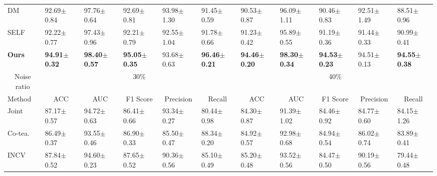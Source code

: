 \begin{table*}[]
\begin{tabular}{@{}lllllllllll@{}}
DM                       & 92.69$\pm$0.84          & 97.76$\pm$0.64          & 92.69$\pm$0.81               & 93.98$\pm$1.30          & 91.45$\pm$0.59             & 90.53$\pm$0.87          & 96.09$\pm$1.11          & 90.46$\pm$0.83               & 92.51$\pm$1.49          & 88.51$\pm$0.96             \\
SELF                            & 92.22$\pm$0.77          & 97.43$\pm$0.96          & 92.21$\pm$0.79               & 92.55$\pm$1.04          & 91.78$\pm$0.66             & 91.23$\pm$0.42          & 95.89$\pm$0.55          & 91.19$\pm$0.36               & 91.44$\pm$0.33          & 90.99$\pm$0.41             \\
\textbf{Ours}                   & \textbf{94.91$\pm$0.32} & \textbf{98.40$\pm$0.57} & \textbf{95.05$\pm$0.35}      & 93.68$\pm$0.63          & \textbf{96.46$\pm$0.21}    & \textbf{94.46$\pm$0.20} & \textbf{98.30$\pm$0.34} & \textbf{94.53$\pm$0.23}      & 94.51$\pm$0.13          & \textbf{94.55$\pm$0.38}    \\ \midrule
\multicolumn{1}{c}{Noise ratio} & \multicolumn{5}{c}{30\%}                                                                                                                & \multicolumn{5}{c}{40\%}                                                                                                                \\ \midrule
Method                & \multicolumn{1}{c}{ACC} & \multicolumn{1}{c}{AUC} & \multicolumn{1}{c}{F1 Score} & \multicolumn{1}{c}{{Precision}} & \multicolumn{1}{c}{Recall} & \multicolumn{1}{c}{ACC} & \multicolumn{1}{c}{AUC} & \multicolumn{1}{c}{F1 Score} & \multicolumn{1}{c}{{Precision}} & \multicolumn{1}{c}{Recall} \\ \midrule
Joint                     & 87.17$\pm$0.57          & 94.72$\pm$0.63          & 86.41$\pm$0.66               & 93.34$\pm$0.27          & 80.44$\pm$0.98             & 84.30$\pm$0.87          & 91.39$\pm$1.02          & 84.46$\pm$0.92               & 84.77$\pm$0.60          & 84.15$\pm$1.26             \\
Co-tea.                     & 86.49$\pm$0.37          & 93.55$\pm$0.46          & 86.90$\pm$0.33               & 85.50$\pm$0.47          & 88.34$\pm$0.20    & 84.92$\pm$0.57          & 92.98$\pm$0.68          & 84.94$\pm$0.54               & 86.02$\pm$0.74          & 83.89$\pm$0.41             \\
INCV                            & 87.84$\pm$0.52          & 94.60$\pm$0.23          & 87.65$\pm$0.52               & 90.36$\pm$0.56          & 85.10$\pm$0.49             & 85.20$\pm$0.48          & 93.52$\pm$0.56          & 84.47$\pm$0.50               & 90.19$\pm$0.56          & 79.44$\pm$0.48             \\

\end{tabular}
\end{table*}
